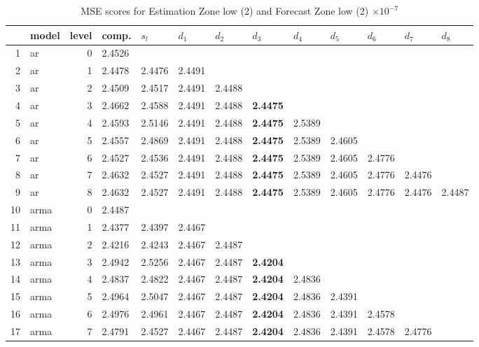 \documentclass[10pt,a4paper]{article}
\begin{document}
\begin{table}[ht]
\centering
\caption{MSE scores for Estimation Zone low (2) and Forecast Zone low (2) $ \times 10^{-7}$} 
\begin{tabular}{rlrllllllllll}
  \hline
 & model & level & comp. & $s_l$ & $d_1$ & $d_2$ & $d_3$ & $d_4$ & $d_5$ & $d_6$ & $d_7$ & $d_8$ \\ 
  \hline
1 & ar &     0 & 2.4526 &  &  &  &  &  &  &  &  &  \\ 
  2 & ar &     1 & 2.4478 & 2.4476 & 2.4491 &  &  &  &  &  &  &  \\ 
  3 & ar &     2 & 2.4509 & 2.4517 & 2.4491 & 2.4488 &  &  &  &  &  &  \\ 
  4 & ar &     3 & 2.4662 & 2.4588 & 2.4491 & 2.4488 & \textbf{2.4475} &  &  &  &  &  \\ 
  5 & ar &     4 & 2.4593 & 2.5146 & 2.4491 & 2.4488 & \textbf{2.4475} & 2.5389 &  &  &  &  \\ 
  6 & ar &     5 & 2.4557 & 2.4869 & 2.4491 & 2.4488 & \textbf{2.4475} & 2.5389 & 2.4605 &  &  &  \\ 
  7 & ar &     6 & 2.4527 & 2.4536 & 2.4491 & 2.4488 & \textbf{2.4475} & 2.5389 & 2.4605 & 2.4776 &  &  \\ 
  8 & ar &     7 & 2.4632 & 2.4527 & 2.4491 & 2.4488 & \textbf{2.4475} & 2.5389 & 2.4605 & 2.4776 & 2.4476 &  \\ 
  9 & ar &     8 & 2.4632 & 2.4527 & 2.4491 & 2.4488 & \textbf{2.4475} & 2.5389 & 2.4605 & 2.4776 & 2.4476 & 2.4487 \\ 
   \hline
10 & arma &     0 & 2.4487 &  &  &  &  &  &  &  &  &  \\ 
  11 & arma &     1 & 2.4377 & 2.4397 & 2.4467 &  &  &  &  &  &  &  \\ 
  12 & arma &     2 & 2.4216 & 2.4243 & 2.4467 & 2.4487 &  &  &  &  &  &  \\ 
  13 & arma &     3 & 2.4942 & 2.5256 & 2.4467 & 2.4487 & \textbf{2.4204} &  &  &  &  &  \\ 
  14 & arma &     4 & 2.4837 & 2.4822 & 2.4467 & 2.4487 & \textbf{2.4204} & 2.4836 &  &  &  &  \\ 
  15 & arma &     5 & 2.4964 & 2.5047 & 2.4467 & 2.4487 & \textbf{2.4204} & 2.4836 & 2.4391 &  &  &  \\ 
  16 & arma &     6 & 2.4976 & 2.4961 & 2.4467 & 2.4487 & \textbf{2.4204} & 2.4836 & 2.4391 & 2.4578 &  &  \\ 
  17 & arma &     7 & 2.4791 & 2.4527 & 2.4467 & 2.4487 & \textbf{2.4204} & 2.4836 & 2.4391 & 2.4578 & 2.4776 &  \\ 

\end{tabular}
\end{table}
\end{document}
